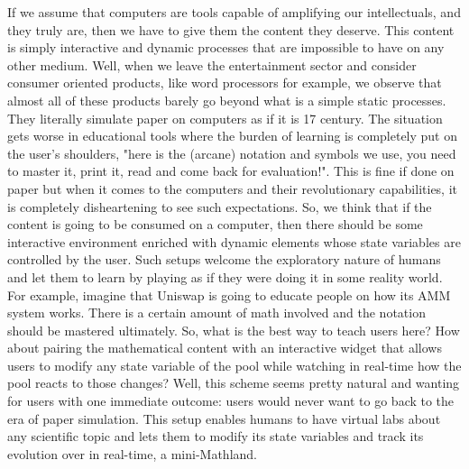 \documentclass[12pt, a4paper]{article}
\begin{document}
If we assume that computers are tools capable of amplifying our intellectuals, and they truly are, then we have to give them the content they deserve. This content is simply interactive and dynamic processes that are impossible to have on any other medium. Well, when we leave the entertainment sector and consider consumer oriented products, like word processors for example, we observe that almost all of these products barely go beyond what is a simple static processes. They literally simulate paper on computers as if it is 17 century. The situation gets worse in educational tools where the  burden of learning is completely put on the user’s shoulders, "here is the (arcane) notation and symbols we use, you need to master it, print it, read and come back for evaluation!". This is fine if done on paper but when it comes to the computers and their revolutionary capabilities, it is completely disheartening to see such expectations. So, we think that if the content is going to be consumed on a computer, then there should be some interactive environment enriched with dynamic elements whose state variables are controlled by the user. Such setups welcome the exploratory nature of humans and let them to learn by playing as if they were doing it in some reality world. For example, imagine that Uniswap is going to educate people on how its AMM system works. There is a certain amount of math involved and the notation should be mastered ultimately. So, what is the best way to teach users here? How about pairing the mathematical content with an interactive widget that allows users to modify any state variable of the pool while watching in real-time how the pool reacts to those changes? Well, this scheme seems pretty natural and wanting for users with one immediate outcome: users would never want to go back to the era of paper simulation. This setup enables humans to have virtual labs about any scientific topic and lets them to modify its state variables and track its evolution over in real-time, a mini-Mathland\cite{papert}.
\end{document}
